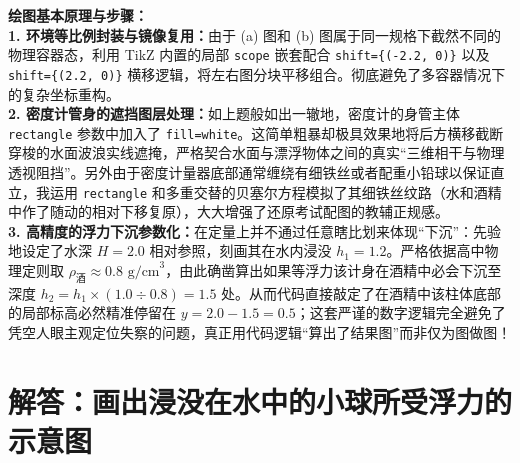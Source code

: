 {\small\color{blue!70!black}
\textbf{绘图基本原理与步骤：}\\
\textbf{1. 环境等比例封装与镜像复用：}由于 (a) 图和 (b) 图属于同一规格下截然不同的物理容器态，利用 TikZ 内置的局部 \texttt{scope} 嵌套配合 \texttt{shift=\{(-2.2, 0)\}} 以及 \texttt{shift=\{(2.2, 0)\}} 横移逻辑，将左右图分块平移组合。彻底避免了多容器情况下的复杂坐标重构。\\
\textbf{2. 密度计管身的遮挡图层处理：}如上题般如出一辙地，密度计的身管主体 \texttt{rectangle} 参数中加入了 \texttt{fill=white}。这简单粗暴却极具效果地将后方横移截断穿梭的水面波浪实线遮掩，严格契合水面与漂浮物体之间的真实“三维相干与物理透视阻挡”。另外由于密度计量器底部通常缠绕有细铁丝或者配重小铅球以保证直立，我运用 \texttt{rectangle} 和多重交替的贝塞尔方程模拟了其细铁丝纹路（水和酒精中作了随动的相对下移复原），大大增强了还原考试配图的教辅正规感。\\
\textbf{3. 高精度的浮力下沉参数化：}在定量上并不通过任意瞎比划来体现“下沉”：先验地设定了水深 $H=2.0$ 相对参照，刻画其在水内浸没 $h_1 = 1.2$。严格依据高中物理定则取 $\rho_{\text{酒}} \approx 0.8\text{ g/cm}^3$，由此确凿算出如果等浮力该计身在酒精中必会下沉至深度 $h_2 = h_1 \times (1.0 \div 0.8) = 1.5$ 处。从而代码直接敲定了在酒精中该柱体底部的局部标高必然精准停留在 $y = 2.0 - 1.5 = 0.5$；这套严谨的数字逻辑完全避免了凭空人眼主观定位失察的问题，真正用代码逻辑“算出了结果图”而非仅为图做图！
}

\vspace{1.0cm}



\section{解答：画出浸没在水中的小球所受浮力的示意图}

\vspace{0.6cm}

